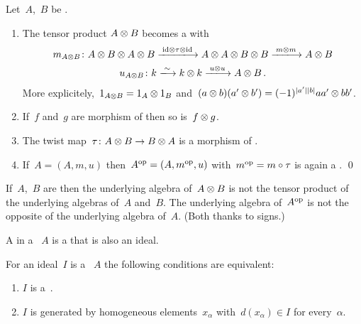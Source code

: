 \documentclass[a4paper,10pt,headings=standardclasses]{scrartcl}
\begin{document}
\begin{lemma}
  Let~$A$,~$B$ be {\dga}.
  \begin{enumerate}
    \item
      The tensor product $A \otimes B$ becomes a {\dga} with
      \begin{gather*}
        m_{A \tensor B}
        \colon
        A \tensor B \tensor A \tensor B
        \xlongto{{\id} \tensor \tau \tensor {\id}}
        A \tensor A \tensor B \tensor B
        \xlongto{m \tensor m}
        A \tensor B
      \\
        u_{A \tensor B}
        \colon
        k
        \xlongto{\sim}
        k \tensor k
        \xlongto{u \tensor u}
        A \tensor B \,.
      \end{gather*}
      More explicitely,~$1_{A \otimes B} = 1_A \otimes 1_B$ and~$(a \otimes b) (a' \otimes b') = (-1)^{\lvert a'\rvert \lvert b\rvert} a a' \otimes b b'$.
    \item
      If~$f$ and~$g$ are morphism of {\dgas} then so is~$f \otimes g$.
    \item
      The twist map~$\tau \colon A \otimes B \to B \otimes A$ is a morphism of {\dgas}.
    \item
      If~$A = (A, m, u)$ then~$A^{\mathrm{op}} = (A, m^{\mathrm{op}}, u)$ with~$m^{\mathrm{op}} = m \circ \tau$ is again a {\dga}.
    \qed
  \end{enumerate}
\end{lemma}

\begin{warning}
  If~$A$,~$B$ are {\dgas} then the underlying algebra of~$A \otimes B$ is not the tensor product of the underlying algebras of~$A$ and~$B$.
  The underlying algebra of~$A^{\mathrm{op}}$ is not the opposite of the underlying algebra of~$A$.
  (Both thanks to signs.)
\end{warning}

\begin{definition}
  A  in a {\dga}~$A$ is a {\dgsub} that is also an ideal.
\end{definition}

\begin{lemma}
  For an ideal~$I$ is a {\dga}~$A$ the following conditions are equivalent:
  \begin{enumerate}
    \item
      $I$ is a~{\dgi}.
    \item
      $I$ is generated by homogeneous elements~$x_\alpha$ with~$d(x_\alpha) \in I$ for every~$\alpha$.
  \end{enumerate}
\end{lemma}
\end{document}
